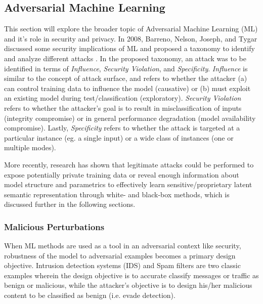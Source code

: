 \documentclass[11pt]{article}
\begin{document}
\subsection{Adversarial Machine Learning}

This section will explore the broader topic of Adversarial Machine Learning (ML) and it's role in security and privacy.  In 2008, Barreno, Nelson, Joseph, and Tygar discussed some security implications of ML and proposed a taxonomy to identify and analyze different attacks \cite{barreno2010security}.  In the proposed taxonomy, an attack was to be identified in terms of \textit{Influence}, \textit{Security Violation}, and \textit{Specificity}.  \textit{Influence} is similar to the concept of attack surface, and refers to whether the attacker (a) can control training data to influence the model (causative) or (b) must exploit an existing model during test/classification (exploratory).  \textit{Security Violation} refers to whether the attacker's goal is to result in misclassification of inputs (integrity compromise) or in general performance degradation (model availability compromise).  Lastly, \textit{Specificity} refers to whether the attack is targeted at a particular instance (eg. a single input) or a wide class of instances (one or multiple modes).

More recently, research has shown that legitimate attacks could be performed to expose potentially private training data or reveal enough information about model structure and parametrics to effectively learn sensitive/proprietary latent semantic representation through white- and black-box methods, which is discussed further in the following sections.

\subsubsection{Malicious Perturbations}

When ML methods are used as a tool in an adversarial context like security, robustness of the model to adversarial examples becomes a primary design objective.  Intrusion detection systems (IDS) and Spam filters are two classic examples wherein the design objective is to accurate classify messages or traffic as benign or malicious, while the attacker's objective is to design his/her malicious content to be classified as benign (i.e. evade detection).  %
\end{document}

